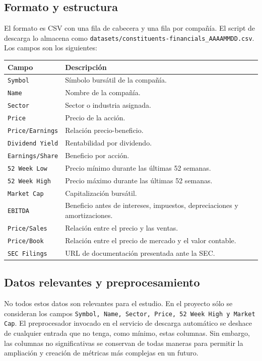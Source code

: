 \documentclass[11pt,a4paper]{article}
\begin{document}
\subsection{Formato y estructura}
El formato es CSV con una fila de cabecera y una fila por compañía. El script de descarga lo almacena como \texttt{datasets/constituents-financials\_AAAAMMDD.csv}. Los campos son los siguientes:

{
\renewcommand{\arraystretch}{0.85}

\begin{longtable}{@{}p{}p{}@{}}
\toprule
Campo & Descripción \\
\midrule
\endhead

\texttt{Symbol} & Símbolo bursátil de la compañía. \\
\texttt{Name} & Nombre de la compañía. \\
\texttt{Sector} & Sector o industria asignada. \\
\texttt{Price} & Precio de la acción. \\
\texttt{Price/Earnings} & Relación precio-beneficio. \\
\texttt{Dividend Yield} & Rentabilidad por dividendo. \\
\texttt{Earnings/Share} & Beneficio por acción. \\
\texttt{52 Week Low} & Precio mínimo durante las últimas 52 semanas. \\
\texttt{52 Week High} & Precio máximo durante las últimas 52 semanas. \\
\texttt{Market Cap} & Capitalización bursátil. \\
\texttt{EBITDA} & Beneficio antes de intereses, impuestos, depreciaciones y amortizaciones. \\
\texttt{Price/Sales} & Relación entre el precio y las ventas. \\
\texttt{Price/Book} & Relación entre el precio de mercado y el valor contable. \\
\texttt{SEC Filings} & URL de documentación presentada ante la SEC. \\

\bottomrule
\end{longtable}
}

\subsection{Datos relevantes y preprocesamiento}

No todos estos datos son relevantes para el estudio. En el proyecto sólo se consideran los campos \texttt{Symbol, Name, Sector, Price, 52 Week High y Market Cap}. El preprocesador invocado en el servicio de descarga automático se deshace de cualquier entrada que no tenga, como mínimo, estas columnas. Sin embargo, las columnas no significativas se conservan de todas maneras para permitir la ampliación y creación de métricas más complejas en un futuro.
\end{document}
